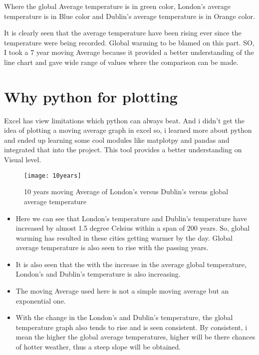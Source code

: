 \documentclass[10pt,journal,compsoc]{IEEEtran}
\begin{document}
Where the global Average temperature is in green color, London's average temperature is in Blue color and Dublin's average temperature is in Orange color.

It is clearly seen that the average temperature have been rising ever since the temperature were being recorded. Global warming to be blamed on this part. SO, I took a 7 year moving Average because it provided a better understanding of the line chart and gave wide range of values where the comparison can be made.

\section{Why python for plotting}
Excel has view limitations which python  can always beat. And i didn't get the idea of plotting a moving average graph in excel so, i learned more about python and ended up learning some cool modules like matplotpy and pandas and integrated that into the project. This tool provides a better understanding on Visual level. 

\begin{figure}[thpb]
      \centering
      \texttt{[image: 10years]}
      \caption{10 years moving Average of London's versus Dublin's versus global average temperature}
      \label{fig: 10 years moving average of London's versus Dublin's versus global average temperature}
\end{figure}

\begin{itemize}
\item Here we can see that London's temperature and Dublin's temperature have increased by almost 1.5 degree Celsius within a span of 200 years. So, global warming has resulted in these cities getting warmer by the day. Global average temperature is also seen to rise with the passing years.

\item It is also seen that the with the increase in the average global temperature, London's and Dublin's temperature is also increasing. 

\item The moving Average used here is not a simple moving average but an exponential one. 

\item With the change in the London's and Dublin's temperature, the global temperature graph also tends to rise and is seen consistent. By consistent, i mean the higher the global average temperatures, higher will be there chances of hotter weather, thus a steep slope will be obtained.
\end{itemize}
\end{document}
